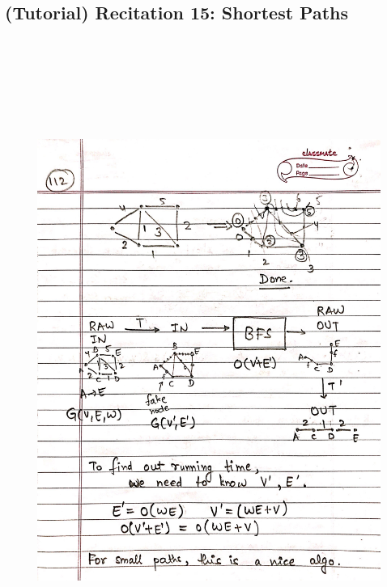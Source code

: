 \newpage
{\color{black} \subsection*{(Tutorial) Recitation 15: Shortest Paths}}
\begin{figure}[H]
    \centering
    \includegraphics[width=16cm, height=21cm]{"./MIT-6.006/MIT-6006-112"}
\end{figure}

